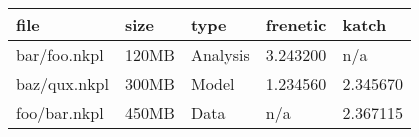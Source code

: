 \begin{tabular}{lllll}
\toprule
file & size & type & frenetic & katch \\
\midrule
bar/foo.nkpl & 120MB & Analysis & 3.243200 & n/a \\
baz/qux.nkpl & 300MB & Model & 1.234560 & 2.345670 \\
foo/bar.nkpl & 450MB & Data & n/a & 2.367115 \\
\bottomrule
\end{tabular}
